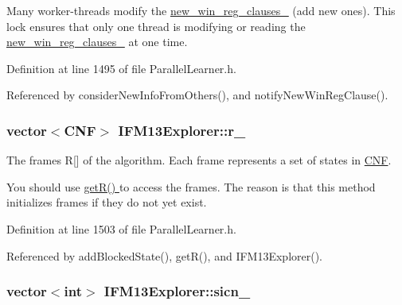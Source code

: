 Many worker-\/threads modify the \hyperlink{classIFM13Explorer_a712b3dc6c099b1e3697e7b8877e0cd90}{new\-\_\-win\-\_\-reg\-\_\-clauses\-\_\-} (add new ones). This lock ensures that only one thread is modifying or reading the \hyperlink{classIFM13Explorer_a712b3dc6c099b1e3697e7b8877e0cd90}{new\-\_\-win\-\_\-reg\-\_\-clauses\-\_\-} at one time. 

Definition at line 1495 of file Parallel\-Learner.\-h.



Referenced by consider\-New\-Info\-From\-Others(), and notify\-New\-Win\-Reg\-Clause().

\hypertarget{classIFM13Explorer_a559dde7f5e4e528ea495c1f4a4d1d072}{
\subsubsection[{r\-\_\-}]{\setlength{\rightskip}{0pt plus 5cm}vector$<${\bf C\-N\-F}$>$ I\-F\-M13\-Explorer\-::r\-\_\-\hspace{0.3cm}{\ttfamily [protected]}}}\label{classIFM13Explorer_a559dde7f5e4e528ea495c1f4a4d1d072}


The frames R\mbox{[}\mbox{]} of the algorithm. Each frame represents a set of states in \hyperlink{classCNF}{C\-N\-F}. 

You should use \hyperlink{classIFM13Explorer_a75a0b20fe6d76b6d1fa52d447fa24d10}{get\-R() } to access the frames. The reason is that this method initializes frames if they do not yet exist. 

Definition at line 1503 of file Parallel\-Learner.\-h.



Referenced by add\-Blocked\-State(), get\-R(), and I\-F\-M13\-Explorer().

\hypertarget{classIFM13Explorer_ad04fb2b668ee928c9c38c61ec1e168ef}{
\subsubsection[{sicn\-\_\-}]{\setlength{\rightskip}{0pt plus 5cm}vector$<$int$>$ I\-F\-M13\-Explorer\-::sicn\-\_\-\hspace{0.3cm}{\ttfamily [protected]}}}\label{classIFM13Explorer_ad04fb2b668ee928c9c38c61ec1e168ef}


